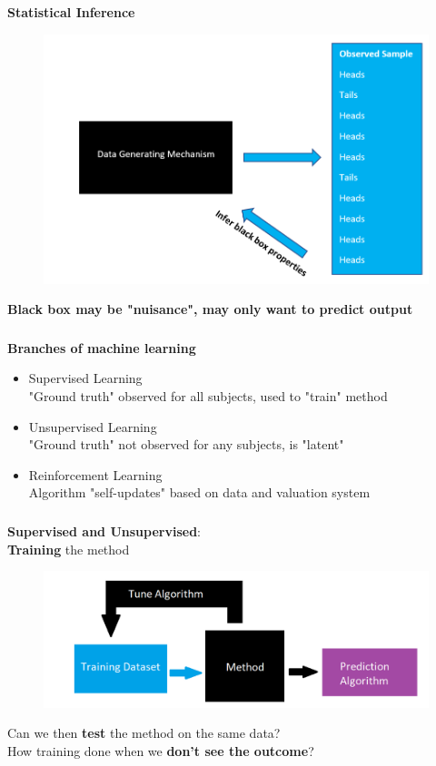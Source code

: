 \documentclass[xcolor=dvipsnames]{beamer}
\begin{document}
\begin{frame}
\frametitle{\insertsectionhead}
\textbf{Statistical Inference}
\begin{figure}
\includegraphics[scale=0.45]{images/dgm_ex.png}
\end{figure}
\textbf{Black box may be "nuisance", may only want to predict output}
\end{frame}

\begin{frame}
\frametitle{\insertsectionhead}
\textbf{Branches of machine learning}
\begin{itemize}
\item Supervised Learning\\
"Ground truth" observed for all subjects, used to "train" method
\item Unsupervised Learning\\
"Ground truth" not observed for any subjects, is "latent"
\item Reinforcement Learning\\
Algorithm "self-updates" based on data and valuation system
\end{itemize}
\end{frame}

\begin{frame}
\frametitle{\insertsectionhead}
\textbf{Supervised and Unsupervised}:\\
\textbf{Training} the method
\begin{figure}
\includegraphics[scale=0.5]{images/training_diagram.png}
\end{figure}
Can we then \textbf{test} the method on the same data?\\
How training done when we \textbf{don't see the outcome}?
\end{frame}
\end{document}
